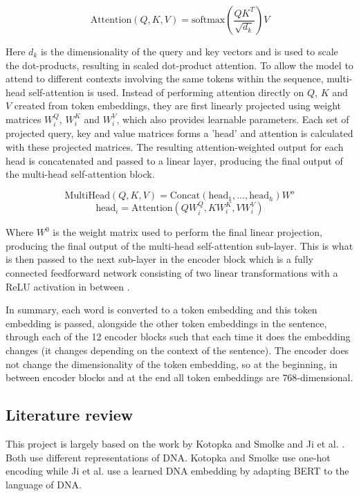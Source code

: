 \documentclass{article}
\begin{document}
$$
\textrm{Attention}(Q,K,V) = \textrm{softmax}\left( \frac{QK^T}{\sqrt{d_k}}\right)V
$$

Here $d_k$ is the dimensionality of the query and key vectors and is used to scale the dot-products, resulting in scaled dot-product attention. To allow the model to attend to different contexts involving the same tokens within the sequence, multi-head self-attention is used. Instead of performing attention directly on $Q$, $K$ and $V$ created from token embeddings, they are first linearly projected using weight matrices $W_i^Q$, $W_i^K$ and $W_i^V$, which also provides learnable parameters. Each set of projected query, key and value matrices forms a 'head' and attention is calculated with these projected matrices. The resulting attention-weighted output for each head is concatenated and passed to a linear layer, producing the final output of the multi-head self-attention block.

$$
\textrm{MultiHead}(Q,K,V)=\textrm{Concat}(\textrm{head}_1, \ldots,\textrm{head}_h)W^o
$$$$
\textrm{head}_i = \textrm{Attention}(QW_i^Q,KW_i^K,VW_i^V)
$$

Where $W^0$ is the weight matrix used to perform the final linear projection, producing the final output of the multi-head self-attention sub-layer. This is what is then passed to the next sub-layer in the encoder block which is a fully connected feedforward network consisting of two linear transformations with a ReLU activation in between \cite{vaswani2017attention}. 

In summary, each word is converted to a token embedding and this token embedding is passed, alongside the other token embeddings in the sentence, through each of the 12 encoder blocks such that each time it does the embedding changes (it changes depending on the context of the sentence). The encoder does not change the dimensionality of the token embedding, so at the beginning, in between encoder blocks and at the end all token embeddings are $768$-dimensional.


\subsection{Literature review}
This project is largely based on the work by Kotopka and Smolke \cite{smolke2020promoter} and Ji et al. \cite{dnabert2020}. Both use different representations of DNA. Kotopka and Smolke \cite{smolke2020promoter} use one-hot encoding while Ji et al. \cite{dnabert2020} use a learned DNA embedding by adapting BERT \cite{devlin2019bert} to the language of DNA.
\end{document}
